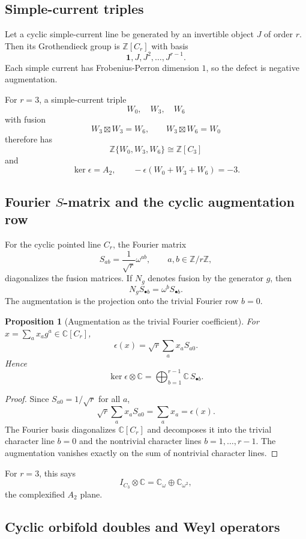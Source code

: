 \documentclass[11pt]{amsart}
\newtheorem{proposition}[theorem]{Proposition}
\newcommand{\ZZ}{\mathbb Z}
\newcommand{\CC}{\mathbb C}
\newcommand{\one}{\mathbf 1}
\begin{document}
\subsection{Simple-current triples}

Let a cyclic simple-current line be generated by an invertible object $J$ of order $r$.  Then its Grothendieck group is $\ZZ[C_r]$ with basis
\[
        \one,J,J^2,\ldots,J^{r-1}.
\]
Each simple current has Frobenius-Perron dimension $1$, so the defect is negative augmentation.

For $r=3$, a simple-current triple
\[
        W_0,
        \quad W_3,
        \quad W_6
\]
with fusion
\[
        W_3\boxtimes W_3=W_6,
        \qquad
        W_3\boxtimes W_6=W_0
\]
therefore has
\[
        \ZZ\{W_0,W_3,W_6\}\cong\ZZ[C_3]
\]
and
\[
        \ker\epsilon=A_2,
        \qquad
        -\epsilon(W_0+W_3+W_6)=-3.
\]


\subsection{Fourier $S$-matrix and the cyclic augmentation row}

For the cyclic pointed line $C_r$, the Fourier matrix
\[
       S_{ab}=\frac1{\sqrt r}\omega^{ab},
       \qquad
       a,b\in\ZZ/r\ZZ,
\]
diagonalizes the fusion matrices.  If $N_g$ denotes fusion by the generator $g$, then
\[
       N_g S_{\bullet b}=\omega^b S_{\bullet b}.
\]
The augmentation is the projection onto the trivial Fourier row $b=0$.

\begin{proposition}[Augmentation as the trivial Fourier coefficient]
For $x=\sum_a x_a g^a\in\CC[C_r]$,
\[
       \epsilon(x)=\sqrt r\sum_a x_a S_{a0}.
\]
Hence
\[
       \ker\epsilon\otimes\CC=\bigoplus_{b=1}^{r-1}\CC\,S_{\bullet b}.
\]
\end{proposition}

\begin{proof}
Since $S_{a0}=1/\sqrt r$ for all $a$,
\[
       \sqrt r\sum_a x_aS_{a0}=\sum_ax_a=\epsilon(x).
\]
The Fourier basis diagonalizes $\CC[C_r]$ and decomposes it into the trivial character line $b=0$ and the nontrivial character lines $b=1,\ldots,r-1$.  The augmentation vanishes exactly on the sum of nontrivial character lines.\end{proof}

For $r=3$, this says
\[
       I_{C_3}\otimes\CC=\CC_\omega\oplus\CC_{\omega^2},
\]
the complexified $A_2$ plane.

\subsection{Cyclic orbifold doubles and Weyl operators}
\end{document}
